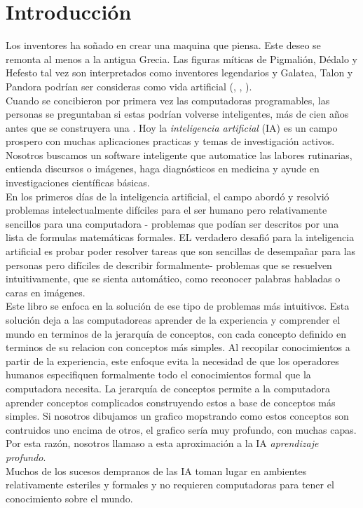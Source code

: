 \chapter{Introducción}
\label{chp:introduccion}
Los inventores ha soñado en crear una maquina que piensa. Este deseo se remonta al menos a la antigua Grecia. Las figuras míticas de Pigmalión, Dédalo y Hefesto tal vez son interpretados como inventores legendarios y Galatea, Talon y Pandora podrían ser consideras como vida artificial (\cite{2005metamorphoses}, \cite{sparkes2013red}, \cite{1997works} ).\\

Cuando se concibieron por primera vez las computadoras programables, las personas se preguntaban si estas podrían volverse inteligentes, más de cien años antes que se construyera una \cite{menabrea1843sketch}. Hoy la \textit{inteligencia artificial} (IA) es un campo prospero con muchas aplicaciones practicas y temas de investigación activos. Nosotros buscamos un software inteligente que automatice las labores rutinarias, entienda discursos o imágenes, haga diagnósticos en medicina y ayude en investigaciones científicas básicas. \\

En los primeros días de la inteligencia artificial, el campo abordó y resolvió problemas intelectualmente difíciles para el ser humano pero relativamente sencillos para una computadora - problemas que podían ser descritos por una lista de formulas matemáticas formales. EL verdadero desafió para la inteligencia artificial es probar poder resolver tareas que son sencillas de desempañar para las personas pero difíciles de describir formalmente- problemas que se resuelven intuitivamente, que se sienta automático, como reconocer palabras habladas o caras en imágenes.\\

Este libro se enfoca en la solución de ese tipo de problemas más intuitivos. Esta solución deja a las computadoreas aprender de la experiencia y comprender el mundo en terminos de la jerarquía de conceptos, con cada concepto definido en terminos de su relacion con conceptos más simples. Al recopilar conocimientos a partir de la experiencia, este enfoque evita la necesidad de que los operadores humanos especifiquen formalmente todo el conocimientos formal que la computadora necesita. La jerarquía de conceptos permite a la computadora aprender conceptos complicados construyendo estos a base de conceptos más simples. Si nosotros dibujamos un grafico mopstrando como estos conceptos son contruidos uno encima de otros, el grafico sería muy profundo, con muchas capas. Por esta razón, nosotros llamaso a esta aproximación a la IA \textit{aprendizaje profundo}.\\

Muchos de los sucesos dempranos de las IA toman lugar en ambientes relativamente esteriles y formales y no requieren computadoras para tener el conocimiento sobre el mundo. 